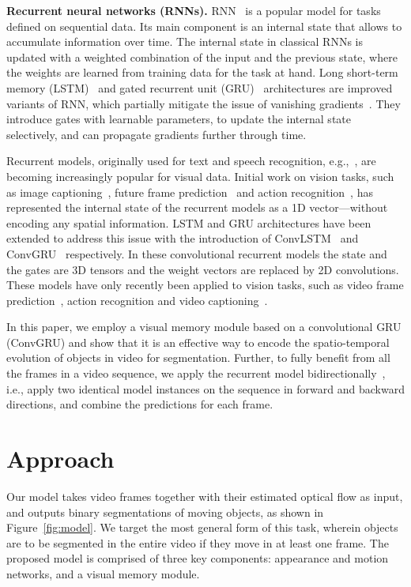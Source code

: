 \documentclass[10pt,twocolumn,letterpaper]{article}
\begin{document}
\noindent \textbf{Recurrent neural networks (RNNs).}
RNN~\cite{hopfield1982neural,rumelhart86} is a popular model for tasks defined
on sequential data. Its main component is an internal state that allows to
accumulate information over time. The internal state in classical RNNs is
updated with a weighted combination of the input and the previous state, where
the weights are learned from training data for the task at hand. Long
short-term memory (LSTM)~\cite{hochreiter1997long} and gated recurrent unit
(GRU)~\cite{Cho14} architectures are improved variants of RNN, which partially
mitigate the issue of vanishing
gradients~\cite{pascanu2013difficulty,Hochreiter98}. They introduce gates with
learnable parameters, to update the internal state selectively, and can
propagate gradients further through time. 

Recurrent models, originally used for text and speech recognition,
e.g.,~\cite{graves2013speech,mikolov2010recurrent}, are becoming increasingly
popular for visual data. Initial work on vision tasks, such as image
captioning~\cite{donahue2015long}, future frame
prediction~\cite{srivastava2015unsupervised} and action
recognition~\cite{NgHVVMT15}, has represented the internal state of the
recurrent models as a 1D vector---without encoding any spatial information.
LSTM and GRU architectures have been extended to address this issue with the
introduction of
ConvLSTM~\cite{xingjian2015convolutional,patraucean2015spatio,finn2016unsupervised}
and ConvGRU~\cite{ballas2015delving} respectively. In these convolutional
recurrent models the state and the gates are 3D tensors and the weight vectors
are replaced by 2D convolutions. These models have only recently been applied
to vision tasks, such as video frame
prediction~\cite{finn2016unsupervised,patraucean2015spatio,xingjian2015convolutional},
action recognition and video captioning~\cite{ballas2015delving}.

In this paper, we employ a visual memory module based on a convolutional GRU
(ConvGRU) and show that it is an effective way to encode the spatio-temporal
evolution of objects in video for segmentation. Further, to fully benefit from
all the frames in a video sequence, we apply the recurrent model
bidirectionally~\cite{graves2005framewise,graves2013hybrid}, i.e., apply two
identical model instances on the sequence in forward and backward directions,
and combine the predictions for each frame. 

\section{Approach}
\label{sec:overview}
Our model takes video frames together with their estimated optical flow as
input, and outputs binary segmentations of moving objects, as shown in
Figure~\ref{fig:model}. We target the most general form of this task, wherein
objects are to be segmented in the entire video if they move in at least one
frame. The proposed model is comprised of three key components: appearance and
motion networks, and a visual memory module.
\end{document}
